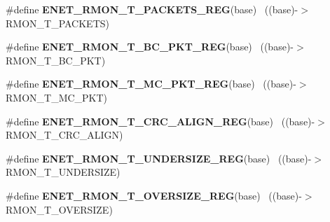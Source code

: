\begin{DoxyCompactItemize}
\item 
\hypertarget{group___e_n_e_t___register___accessor___macros_gadfe59285c02059d239aebd9f7189f35f}{}\#define {\bfseries E\+N\+E\+T\+\_\+\+R\+M\+O\+N\+\_\+\+T\+\_\+\+P\+A\+C\+K\+E\+T\+S\+\_\+\+R\+E\+G}(base)                    ~((base)-\/$>$R\+M\+O\+N\+\_\+\+T\+\_\+\+P\+A\+C\+K\+E\+T\+S)\label{group___e_n_e_t___register___accessor___macros_gadfe59285c02059d239aebd9f7189f35f}

\item 
\hypertarget{group___e_n_e_t___register___accessor___macros_ga14eae412ae076275e21aeaf41fba752c}{}\#define {\bfseries E\+N\+E\+T\+\_\+\+R\+M\+O\+N\+\_\+\+T\+\_\+\+B\+C\+\_\+\+P\+K\+T\+\_\+\+R\+E\+G}(base)                      ~((base)-\/$>$R\+M\+O\+N\+\_\+\+T\+\_\+\+B\+C\+\_\+\+P\+K\+T)\label{group___e_n_e_t___register___accessor___macros_ga14eae412ae076275e21aeaf41fba752c}

\item 
\hypertarget{group___e_n_e_t___register___accessor___macros_ga0de3955d72a01c4a7df78eead5a412a0}{}\#define {\bfseries E\+N\+E\+T\+\_\+\+R\+M\+O\+N\+\_\+\+T\+\_\+\+M\+C\+\_\+\+P\+K\+T\+\_\+\+R\+E\+G}(base)                      ~((base)-\/$>$R\+M\+O\+N\+\_\+\+T\+\_\+\+M\+C\+\_\+\+P\+K\+T)\label{group___e_n_e_t___register___accessor___macros_ga0de3955d72a01c4a7df78eead5a412a0}

\item 
\hypertarget{group___e_n_e_t___register___accessor___macros_gabb560aec3fd182b682a4bfcb9f26c99f}{}\#define {\bfseries E\+N\+E\+T\+\_\+\+R\+M\+O\+N\+\_\+\+T\+\_\+\+C\+R\+C\+\_\+\+A\+L\+I\+G\+N\+\_\+\+R\+E\+G}(base)                ~((base)-\/$>$R\+M\+O\+N\+\_\+\+T\+\_\+\+C\+R\+C\+\_\+\+A\+L\+I\+G\+N)\label{group___e_n_e_t___register___accessor___macros_gabb560aec3fd182b682a4bfcb9f26c99f}

\item 
\hypertarget{group___e_n_e_t___register___accessor___macros_ga8e1111e27db0dc64f30b5fa1e0f8c3c4}{}\#define {\bfseries E\+N\+E\+T\+\_\+\+R\+M\+O\+N\+\_\+\+T\+\_\+\+U\+N\+D\+E\+R\+S\+I\+Z\+E\+\_\+\+R\+E\+G}(base)                ~((base)-\/$>$R\+M\+O\+N\+\_\+\+T\+\_\+\+U\+N\+D\+E\+R\+S\+I\+Z\+E)\label{group___e_n_e_t___register___accessor___macros_ga8e1111e27db0dc64f30b5fa1e0f8c3c4}

\item 
\hypertarget{group___e_n_e_t___register___accessor___macros_ga0e5cbe2bce9e60ff93f33ac2b2853a5f}{}\#define {\bfseries E\+N\+E\+T\+\_\+\+R\+M\+O\+N\+\_\+\+T\+\_\+\+O\+V\+E\+R\+S\+I\+Z\+E\+\_\+\+R\+E\+G}(base)                  ~((base)-\/$>$R\+M\+O\+N\+\_\+\+T\+\_\+\+O\+V\+E\+R\+S\+I\+Z\+E)\label{group___e_n_e_t___register___accessor___macros_ga0e5cbe2bce9e60ff93f33ac2b2853a5f}


\end{DoxyCompactItemize}

